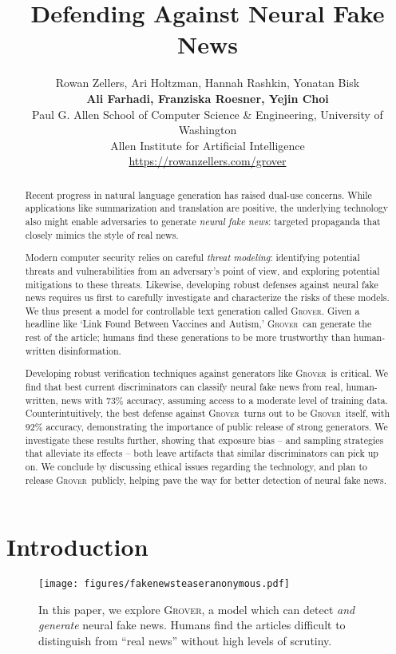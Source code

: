\documentclass{article}
\title{Defending Against Neural Fake News}
\author{Rowan Zellers, Ari Holtzman, Hannah Rashkin, Yonatan Bisk \\ \textbf{Ali Farhadi, Franziska Roesner, Yejin Choi}\\
  Paul G. Allen School of Computer Science \& Engineering, University of Washington \\
  Allen Institute for Artificial Intelligence \\
  \url{https://rowanzellers.com/grover}
}
\newcommand{\modelname}{{\textsc{Grover}}}
\begin{document}
\maketitle

\begin{abstract}
 \vspace{-2mm}
Recent progress in natural language generation has raised dual-use concerns. While applications like summarization and translation are positive, the underlying technology also might enable adversaries to generate \emph{neural fake news}: targeted propaganda that closely mimics the style of real news.

Modern computer security relies on careful \emph{threat modeling}: identifying potential threats and vulnerabilities from an adversary's point of view, and exploring potential mitigations to these threats.
Likewise, developing robust defenses against neural fake news requires us first to carefully investigate and characterize the risks of these models. We thus present a model for controllable text generation called \modelname. Given a headline like `Link Found Between Vaccines and Autism,' \modelname~can generate the rest of the article; humans find these generations to be more trustworthy than human-written disinformation.

Developing robust verification techniques against generators like \modelname~is critical.
We find that best current discriminators can classify neural fake news from real, human-written, news with 73\% accuracy, assuming access to a moderate level of training data. Counterintuitively, the best defense against \modelname~turns out to be \modelname~itself, with 92\% accuracy, demonstrating the importance of public release of strong generators. We investigate these results further, showing that exposure bias -- and sampling strategies that alleviate its effects -- both leave artifacts that similar discriminators can pick up on.
We conclude by discussing ethical issues regarding the technology, and plan to release \modelname~publicly, helping pave the way for better detection of neural fake news.  \vspace{-2mm}
\end{abstract}

\section{Introduction}
\begin{figure}[b!]
\vspace{-3mm}
  \centering\small
    \texttt{[image: figures/fakenewsteaseranonymous.pdf]}
    \vspace{-4mm}
\caption{In this paper, we explore \modelname, a model which can detect \emph{and generate} neural fake news. Humans find the articles difficult to distinguish from ``real news'' without high levels of scrutiny.}
\vspace{-5mm}
  \label{fig:teaser}
\end{figure}
\end{document}
